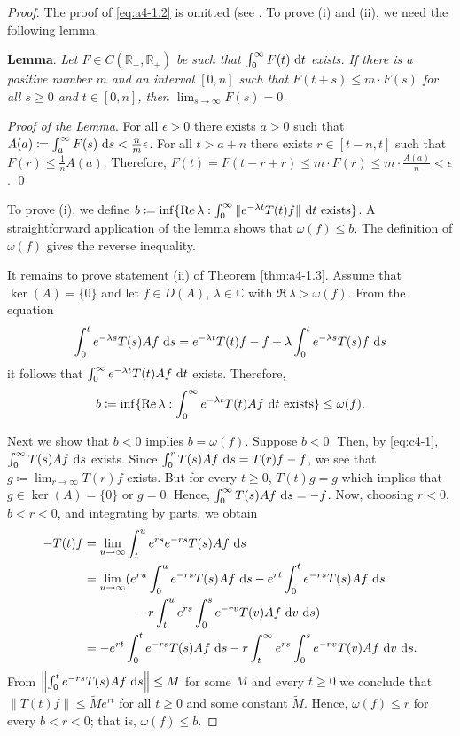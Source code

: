 \begin{proof}  The proof of \eqref{eq:a4-1.2} is omitted (see \citet[p.306]{hillephillips:1957}. 
To prove (i) and (ii), we need the following lemma.

\bigskip
\noindent
{\bf Lemma}. 
\label{lem:a4-1.3}
{\it Let $F \in C(\mathbb{R}_{+},\mathbb{R}_{+})$ be such that $\int_{0}^{\infty} F(t) \,\mathop{}\!\mathrm{d}{t}$ exists. 
If there is a positive number $m$ and an interval $[0,n]$ such that $F(t + s) \leq m \cdot F(s)$ for all $s \geq 0$ and $t \in [0,n]$, then $\lim_{s \to \infty} F(s) = 0$.}

\medskip\noindent
\textit{Proof of the Lemma}. 
For all $\epsilon > 0$ there exists $a > 0$ such that $A(a) \coloneqq \int_{a}^{\infty} F(s) \,\mathop{}\!\mathrm{d}{s} < \frac{n}{m}\epsilon$.
For all $t > a+n$ there exists $r \in [t-n,t]$ such that $F(r) \leq \frac{1}{n}A(a)$.
Therefore, $F(t) = F(t-r+r) \leq m \cdot F(r) \leq m \cdot \frac{A(a)}{n} < \epsilon$. 
\qed

\bigskip
To prove (i), we define $b \coloneqq \inf\{\mathop{}\!\mathrm{Re}\,\lambda : \int_{0}^{\infty} \|e^{-\lambda t} T(t)f\| \,\mathop{}\!\mathrm{d}{t} \text{ exists}\}$. 
A straightforward application of the lemma shows that $\omega(f) \leq b$.
The definition of $\omega(f)$ gives the reverse inequality.

\goodbreak
It remains to prove statement (ii) of Theorem \ref{thm:a4-1.3}.
Assume that $\ker(A) = \{0\}$ and let $f \in D(A)$, $\lambda \in \mathbb{C}$ with $\Re\,\lambda > \omega(f)$. 
From the equation
\[
\int_{0}^{t} e^{-\lambda s} T(s)Af \,\mathop{}\!\mathrm{d}{s} = e^{-\lambda t}T(t)f - f + \lambda \int_{0}^{t} e^{-\lambda s} T(s)f \,\mathop{}\!\mathrm{d}{s}
\]
it follows that $\int_{0}^{\infty} e^{-\lambda t} T(t)Af \,\mathop{}\!\mathrm{d}{t}$ exists. 
Therefore, 
\[b \coloneqq \inf\{\mathop{}\!\mathrm{Re}\,\lambda : \int_{0}^{\infty} e^{-\lambda t}T(t)Af \,\mathop{}\!\mathrm{d}{t} \text{ exists}\} \leq \omega(f).\]

\noindent
Next we show that $b < 0$ implies $b = \omega(f)$. 
Suppose $b < 0$. 
Then, by \eqref{eq:c4-1}, $\int_{0}^{\infty} T(s)Af \,\mathop{}\!\mathrm{d}{s}$ exists. 
Since $\int_{0}^{r} T(s)Af \,\mathop{}\!\mathrm{d}{s} = T(r)f - f$, we see that $g \coloneqq\lim_{r \to \infty} T(r)f$ exists. 
But for every $t \geq 0$, $T(t)g = g$ which implies that $g \in \ker(A) = \{0\}$ or $g = 0$. 
Hence, $\int_{0}^{\infty} T(s)Af \,\mathop{}\!\mathrm{d}{s} = -f$.
Now, choosing $r < 0$, $b < r < 0$, and integrating by parts, we obtain
\begin{align*}
-T(t)f &= \lim_{u \to \infty} \int_{t}^{u} e^{r s} e^{-r s} T(s)Af \,\ds\\
&= \lim_{u \to \infty} ( e^{ru}\int_0^ue^{-rs} T(s)Af \,\ds - e^{rt}\int_0^te^{-rs} T(s)Af \,\ds\\ 
& \qquad \qquad -r\int_t^u e^{rs}\int_0^s e^{-rv} T(v)Af\,\diff{v} \,\ds
) \\
&= - e^{rt}\int_0^te^{-rs} T(s)Af \,\ds -r\int_t^\infty e^{rs}\int_0^s e^{-rv} T(v)Af\,\diff{v} \,\ds.
\end{align*}
From $\left\|\int_{0}^{t} e^{-r s} T(s)Af \,\mathop{}\!\mathrm{d}{s}\right\| \leq M$ for some $M$ and every $t \geq 0$ we conclude that $\|T(t)f\| \leq \tilde{M}e^{rt}$ for all $t \geq 0$ and some constant $\tilde{M}$.
Hence, $\omega(f) \leq r$ for every $b < r < 0$; that is, $\omega(f) \leq b$.


\end{proof}
